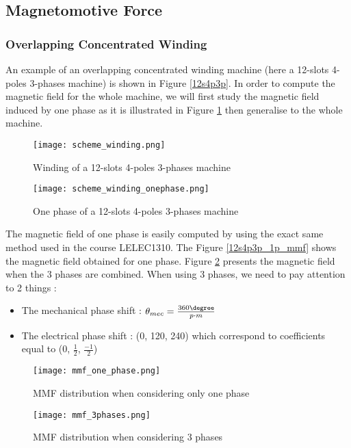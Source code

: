\subsection{Magnetomotive Force}
\subsubsection{Overlapping Concentrated Winding}
An example of an overlapping concentrated winding machine (here a 12-slots 4-poles 3-phases machine) is shown in Figure \ref{12s4p3p}. In order to compute the magnetic field for the whole machine, we will first study the magnetic field induced by one phase as it is illustrated in Figure \ref{12s4p3p_1p} then generalise to the whole machine.

\begin{figure}[H]
    \begin{minipage}{.45 \textwidth }
        \centering
        \texttt{[image: scheme\_winding.png]}
        \caption{Winding of a 12-slots 4-poles 3-phases machine}
        \label{12s4p3p}
    \end{minipage}
    \begin{minipage}{.45 \textwidth }
        \centering
        \texttt{[image: scheme\_winding\_onephase.png]}
        \caption{One phase of a 12-slots 4-poles 3-phases machine}
        \label{12s4p3p_1p}
    \end{minipage}
\end{figure}

The magnetic field of one phase is easily computed by using the exact same method used in the course LELEC1310. The Figure \ref{12s4p3p_1p_mmf} shows the magnetic field obtained for one phase. Figure \ref{12s4p3p_3p_mmf} presents the magnetic field when the 3 phases are combined. When using 3 phases, we need to pay attention to 2 things : 
\begin{itemize}
    \item The mechanical phase shift : $\theta_{mec}=\frac{360\degree}{p \cdot m}$ 
    \item The electrical phase shift : (0\degree , 120\degree , 240\degree) which correspond to coefficients equal to (0, $\frac{1}{2}$, $\frac{-1}{2}$)
\end{itemize}

\begin{figure}[H]
    \begin{minipage}{.45 \textwidth }
        \centering
        \texttt{[image: mmf\_one\_phase.png]}
        \caption{MMF distribution when considering only one phase}
        \label{12s4p3p_1p_mmf}
    \end{minipage}
    \begin{minipage}{.45 \textwidth }
        \centering
        \texttt{[image: mmf\_3phases.png]}
        \caption{MMF distribution when considering 3 phases}
        \label{12s4p3p_3p_mmf}
    \end{minipage}
\end{figure}

